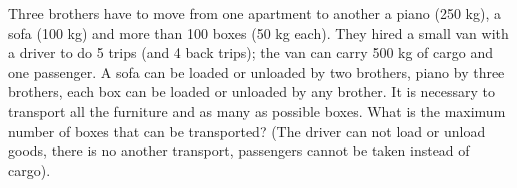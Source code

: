 \problem
Three brothers have to move from one apartment to another a piano
(250 kg), a sofa (100 kg) and more than 100 boxes (50 kg each).
They hired a small van with a driver to do 5 trips (and 4 back trips);
the van can carry 500 kg of cargo and one passenger.
A sofa can be loaded or unloaded by two brothers, piano by three brothers, each
box can be loaded or unloaded by any brother.
It is necessary to transport all the furniture and as many as possible boxes.
What is the maximum number of boxes that can be transported?
(The driver can not load or unload goods, there is no another transport,
passengers cannot be taken instead of cargo).

\solution

\endproblem
